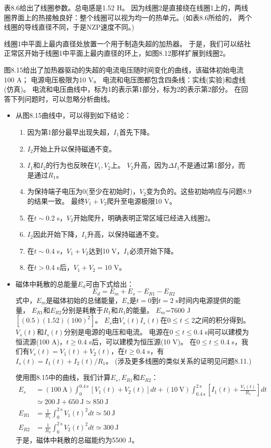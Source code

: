 表8.6给出了线圈参数。总电感是1.52 H。
因为线圈2是直接绕在线圈1上的，两线圈界面上的热接触良好：整个线圈可以视为均一的热单元。(如表8.6所给的，
两个线圈的导线直径不同，于是NZP速度不同。)

线圈1中平面上最内直径处放置一个用于制造失超的加热器。
于是，我们可以结社正常区开始于线圈1中平面上最内直径的环上，如图8.12那样扩展到线圈2。

图8.15给出了加热器驱动的失超的电流电压随时间变化的曲线，该磁体初始电流100 A；
电源电压极限为10 V。
电流和电压图都包含四条线：实线(实验)和虚线(仿真)。
电流和电压曲线中，标为1的表示第1部分，标为2的表示第2部分。
在回答下列问题时，可以忽略分析曲线。

\begin{itemize}
\item 从图8.15曲线中，可以得到如下结论：
	\begin{enumerate}
		\item  因为第1部分最早出现失超，$I_1$首先下降。
		\item $I_2$开始上升以保持磁通不变。
		\item $I_1$和$I_2$的行为也反映在$V_1,V_2$上。
		$V_2$升高，因为$\Delta I_1$不是通过第1部分，而是通过$R_1$。
		\item 为保持端子电压为0(至少在初始时)，$V_2$变为负的。这些初始响应与问题8.9的结果一致。
		最终$V_1+V_2$爬升至电源极限10 V。
		\item 在$t\sim$0.2 s，$V_2$开始爬升，明确表明正常区域已经进入线圈2。
		\item $I_2$因此开始下降，$I_1$升高，以保持磁通不变。
		\item 在$t\sim$0.4 s，$V_1+V_2$达到10 V，$I_1$必须开始下降。
		\item 在$t>$0.4 s后，$V_1+V_2=10$ V。
	\end{enumerate}
\item 磁体中耗散的总能量$E_d$可由下式给出：
\begin{equation}%
E_d=E_m+E_s-E_{R1}-E_{R2}
\end{equation}
式中，$E_m$是磁体初始的总储能量，$E_s$是$t=0$到$t=2$ s时间内电源提供的能量，
$E_{R1}$和$E_{R2}$分别是耗散于$R_1$和$R_1$的能量。
$E_m$=7600 J$[(0.5)(1.52)(100)^2]$。
$E_s$由$V_s(t)I_s(t)$在$0\le t\le 2$之间的积分得到。
$V_s(t)$和$I_s(t)$分别是电源的电压和电流。
电源在$0\le t\le$0.4 s间可以建模为恒流源(100 A)，$t\ge 0.4$ s后，可以建模为恒压源(10 V)。
在$0\le t\le$0.4 s，我们有$V_s(t)=V_1(t)+V_2(t)$，在$t\ge 0.4$ s，有$I_s(t)=I_1(t)+I_2(t)/R_1$。
(涉及更多线圈的类似关系的证明见问题8.11.)

使用图8.15中的曲线，我们计算$E_s,E_{R1}$和$E_{R2}$：
\begin{align*}
E_s&=(100\ \mathrm{A})\int_{0}^{0.4\ \mathrm{s}}[V_1(t)+V_2(t)]dt+(10\ \mathrm{V})\int_{0.4\ \mathrm{s}}^{2\ \mathrm{s}}\left[I_1(t)+\frac{V_1(t)}{R_1}\right]dt \\
&\simeq 200\ \mathrm{J}+650\ \mathrm{J}\simeq 850\ \mathrm{J}\\
E_{R1}&=\frac{1}{R_1}\int_{0}^{2\ \mathrm{s}}V_1(t)^2dt\simeq 50\ \mathrm{J} \\
E_{R2}&=\frac{1}{R_2}\int_{0}^{2\ \mathrm{s}}V_2(t)^2dt\simeq 300\ \mathrm{J}
\end{align*}
于是，磁体中耗散的总磁能约为5500 J。


\end{itemize}

